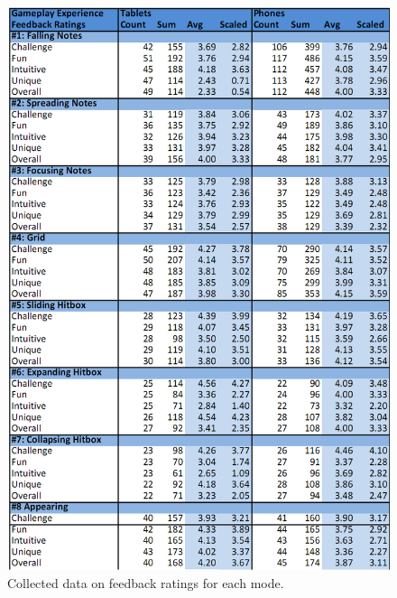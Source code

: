 \documentclass{sig-alternate}
\begin{document}
\begin{figure}[htb!]
	\begin{center}
		\includegraphics[width=0.9\linewidth]{figure_data_rating}
	\end{center}
	\vspace{-12pt}
	\caption{Collected data on feedback ratings for each mode.}
	\label{fig:data_rating}
\end{figure}
\end{document}
